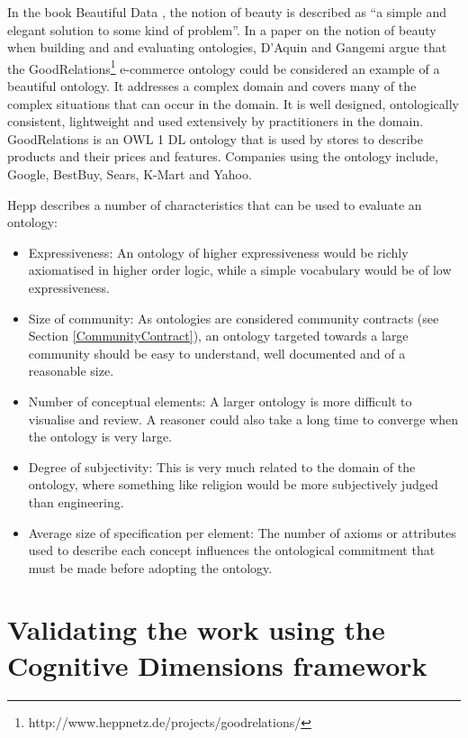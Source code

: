 In the book Beautiful Data \cite{Segaran2009}, the notion of beauty is described as ``a simple and elegant solution to some kind of problem''. In a paper on the notion of beauty when building and and evaluating ontologies, D'Aquin and Gangemi \cite{DAquin2011} argue that the GoodRelations\footnote{http://www.heppnetz.de/projects/goodrelations/} e-commerce ontology could be considered an example of a beautiful ontology. It addresses a complex domain and covers many of the complex situations that can occur in the domain. It is well designed, ontologically consistent, lightweight and used extensively by practitioners in the domain. GoodRelations is an OWL 1 DL ontology that is used by stores to describe products and their prices and features. Companies using the ontology include, Google, BestBuy, Sears, K-Mart and Yahoo.

Hepp \cite{Hepp2007} describes a number of characteristics that can be used to evaluate an ontology:

\begin{itemize}
	\item Expressiveness: An ontology of higher expressiveness would be richly axiomatised in higher order logic, while a simple vocabulary would be of low expressiveness.
	\item Size of community: As ontologies are considered community contracts (see Section \ref{CommunityContract}), an ontology targeted towards a large community should be easy to understand, well documented and of a reasonable size.
	\item Number of conceptual elements: A larger ontology is more difficult to visualise and review. A reasoner could also take a long time to converge when the ontology is very large.
	\item Degree of subjectivity: This is very much related to the domain of the ontology, where something like religion would be more subjectively judged than engineering.
	\item Average size of specification per element: The number of axioms or attributes used to describe each concept influences the ontological commitment\label{OntologicalCommitment} that must be made before adopting the ontology. 
\end{itemize}


\section{Validating the work using the Cognitive Dimensions framework}
\label{CognitiveDimensions}

